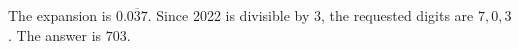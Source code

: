The expansion is $0.\overline{037}$. Since 2022 is divisible by 3, the requested digits are $7,0,3$. The answer is $\boxed{703}$.

